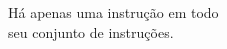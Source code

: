 \documentclass[preview]{standalone}
\begin{document}
Há apenas uma instrução em todo\\ seu conjunto de instruções.\\
\end{document}
